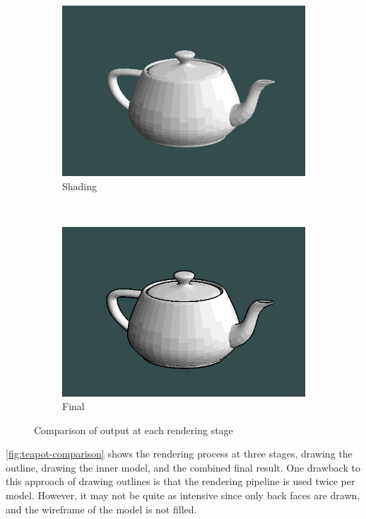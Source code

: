\begin{figure}[h]
\begin{subfigure}[b]{0.2\textwidth}
        \includegraphics[width=\textwidth]{img/teapot-model.png}
        \caption{Shading}
        \label{fig:model-render}
    \end{subfigure}
    ~
    \begin{subfigure}[b]{0.2\textwidth}
        \includegraphics[width=\textwidth]{img/teapot-complete.png}
        \caption{Final}
        \label{fig:complete-render}
    \end{subfigure}
    \caption{Comparison of output at each rendering stage}
    \label{fig:teapot-comparison}
\end{figure}

\autoref{fig:teapot-comparison} shows the rendering process at three stages, drawing the outline,
drawing the inner model, and the combined final result. One drawback to this approach of drawing
outlines is that the rendering pipeline is used twice per model. However, it may not be quite as 
intensive since only back faces are drawn, and the wireframe of the model is not filled.
